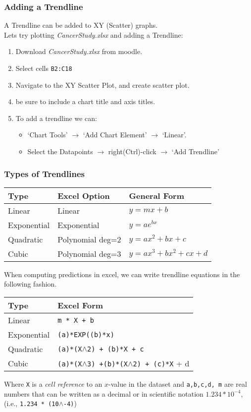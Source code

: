 \documentclass[12pt]{beamer}
\begin{document}
	\begin{frame}
		\frametitle{Adding a Trendline}
		A Trendline can be added to XY (Scatter) graphs. \\
		Lets try plotting \textit{CancerStudy.xlsx} and adding a Trendline:
		\begin{enumerate}
			\item Download \textit{CancerStudy.xlsx} from moodle.
			\item Select cells \texttt{B2:C18}
			\item Navigate to the XY Scatter Plot, and create scatter plot.
			\item be sure to include a chart title and axis titles.
			\item To add a trendline we can:
				\begin{itemize}
					\item `Chart Tools' $\rightarrow$ `Add Chart Element' $\rightarrow$ `Linear'.
					\item Select the Datapoints $\rightarrow$ right(Ctrl)-click $\rightarrow$ `Add Trendline'
				\end{itemize}
		\end{enumerate}
	\end{frame}

	\begin{frame}
		\frametitle{Types of Trendlines}
		\begin{center}
		\begin{tabular}{l  |l   |l  }
			Type & Excel Option & General Form \\
			\hline
			Linear & Linear & $y=mx+b$\\
			Exponential &  Exponential & $y=ae^{bx}$\\
			Quadratic & Polynomial deg=2 & $y=ax^2 + bx+ c$\\
			Cubic & Polynomial deg=3 & $y=ax^3 + bx^2 + cx + d$
		\end{tabular}
		\end{center}
		When computing predictions in excel, we can write trendline equations in the following fashion.
		\begin{center}
		\begin{tabular}{l | l} 
		Type & Excel Form\\
		\hline
		Linear & \texttt{m * X + b}\\
		Exponential& \texttt{(a)*EXP((b)*x)}\\
		Quadratic & \texttt{(a)*(X$\wedge$2) + (b)*X + c}\\
		Cubic & \texttt{(a)*(X$\wedge$3) +(b)*(X$\wedge$2) + (c)*X} + d\\
		\end{tabular}
		\end{center}
		Where \texttt{X} is a \textit{cell reference} to an $x$-value in the dataset and \texttt{a,b,c,d, m} are real numbers that can be written as a decimal or in 
		scientific notation $1.234 * 10^{-4}$, (i.e., \texttt{1.234 * (10$\wedge$-4)})
	\end{frame}
\end{document}
